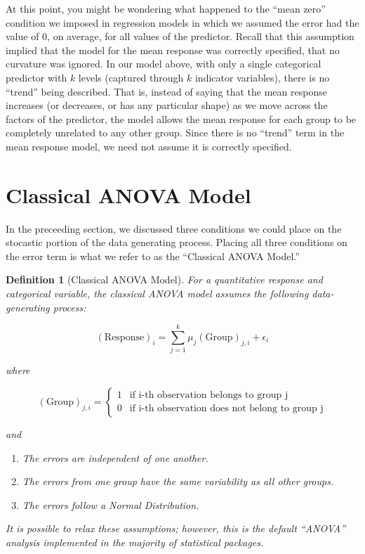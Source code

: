 \documentclass[
]{book}
\providecommand{\tightlist}{%
  \setlength{\itemsep}{0pt}\setlength{\parskip}{0pt}}
\theoremstyle{plain}
\theoremstyle{mydefn}
\newtheorem{definition}{Definition}[chapter]
\theoremstyle{myexmpl}
\theoremstyle{remark}
\begin{document}
At this point, you might be wondering what happened to the ``mean zero'' condition we imposed in regression models in which we assumed the error had the value of 0, on average, for all values of the predictor. Recall that this assumption implied that the model for the mean response was correctly specified, that no curvature was ignored. In our model above, with only a single categorical predictor with \(k\) levels (captured through \(k\) indicator variables), there is no ``trend'' being described. That is, instead of saying that the mean response increases (or decreases, or has any particular shape) as we move across the factors of the predictor, the model allows the mean response for each group to be completely unrelated to any other group. Since there is no ``trend'' term in the mean response model, we need not assume it is correctly specified.

\hypertarget{classical-anova-model}{%
\section{Classical ANOVA Model}\label{classical-anova-model}}

In the preceeding section, we discussed three conditions we could place on the stocastic portion of the data generating process. Placing all three conditions on the error term is what we refer to as the ``Classical ANOVA Model.''

\begin{definition}[Classical ANOVA Model]
\protect\hypertarget{def:defn-classical-anova}{}{\label{def:defn-classical-anova} {} }For a quantitative response and categorical variable, the classical ANOVA model assumes the following data-generating process:

\[(\text{Response})_i = \sum_{j=1}^{k} \mu_j (\text{Group})_{j, i} + \epsilon_i\]

where

\[(\text{Group})_{j,i} = \begin{cases}
  1 & \text{if i-th observation belongs to group j} \\
  0 & \text{if i-th observation does not belong to group j}
  \end{cases}\]

and

\begin{enumerate}
\def\labelenumi{\arabic{enumi}.}
\tightlist
\item
  The errors are independent of one another.
\item
  The errors from one group have the same variability as all other groups.
\item
  The errors follow a Normal Distribution.
\end{enumerate}

It is possible to relax these assumptions; however, this is the default ``ANOVA'' analysis implemented in the majority of statistical packages.
\end{definition}
\end{document}
